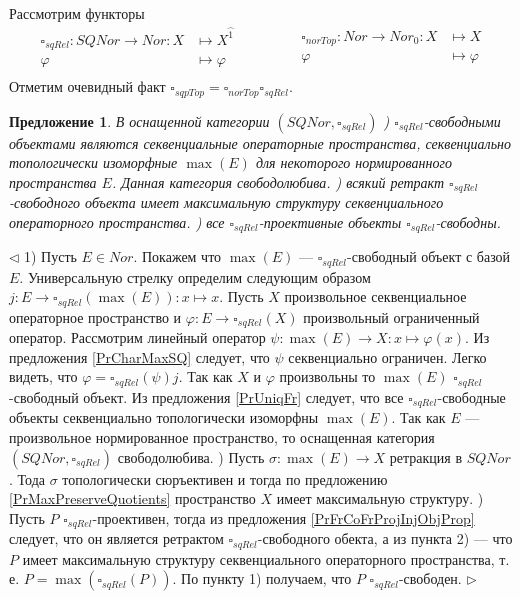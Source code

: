 \documentclass[12pt]{article}
\newtheorem{proposition}[theorem]{Предложение}
\newenvironment{proof}{\par $\triangleleft$}{$\triangleright$}
\begin{document}
Рассмотрим функторы
$$
\begin{aligned}
\square_{sqRel} : SQNor \to Nor: X &\mapsto X^{\wideparen{1}}\\
\varphi&\mapsto\varphi\\
\end{aligned}
\qquad\qquad
\begin{aligned}
\square_{norTop} : Nor \to Nor_0: X &\mapsto X\\
\varphi&\mapsto\varphi\\
\end{aligned}
$$
Отметим очевидный факт $\square_{sqpTop}=\square_{norTop}\square_{sqRel}$.

\begin{proposition}\label{PrSQRelChar}
В оснащенной категории $(SQNor,\square_{sqRel})$
) $\square_{sqRel}$-свободными объектами являются секвенциальные операторные пространства, секвенциально топологически изоморфные $\max(E)$ для некоторого нормированного пространства $E$. Данная категория свободолюбива. 
) всякий ретракт $\square_{sqRel}$-свободного объекта имеет максимальную структуру секвенциального операторного пространства.
) все $\square_{sqRel}$-проективные объекты $\square_{sqRel}$-свободны.
\end{proposition}
\begin{proof}
1) Пусть $E\in Nor$. Покажем что $\max(E)$ --- $\square_{sqRel}$-свободный объект с базой $E$. Универсальную стрелку определим следующим образом $j:E\to\square_{sqRel}(\max(E)):x\mapsto x$. Пусть $X$ 
произвольное секвенциальное операторное пространство и $\varphi:E\to\square_{sqRel}(X)$ произвольный ограниченный оператор. Рассмотрим линейный оператор $\psi: \max(E)\to X:x\mapsto\varphi(x)$. Из предложения \ref{PrCharMaxSQ} 
следует, что $\psi$ секвенциально ограничен. Легко видеть, что $\varphi=\square_{sqRel}(\psi)j$. Так как $X$ и $\varphi$ произвольны то $\max(E)$ $\square_{sqRel}$-свободный объект. Из предложения \ref{PrUniqFr} следует, что все $\square_{sqRel}$-свободные объекты секвенциально топологически изоморфны 
$\max(E)$. Так как $E$ --- произвольное нормированное пространство, то оснащенная категория $(SQNor,\square_{sqRel})$ свободолюбива.
) Пусть $\sigma:\max(E)\to X$ ретракция в $SQNor$. Тода $\sigma$ топологически сюръективен и тогда по предложению \ref{PrMaxPreserveQuotients} пространство $X$ имеет максимальную структуру.
) Пусть $P$ $\square_{sqRel}$-проективен, тогда из предложения \ref{PrFrCoFrProjInjObjProp} следует, что он является ретрактом $\square_{sqRel}$-свободного обекта, а из пункта 2) --- что $P$ имеет 
максимальную структуру секвенциального операторного пространства, т. е. $P=\max(\square_{sqRel}(P))$. По пункту 1) получаем, что $P$ $\square_{sqRel}$-свободен.  
\end{proof}
\end{document}
